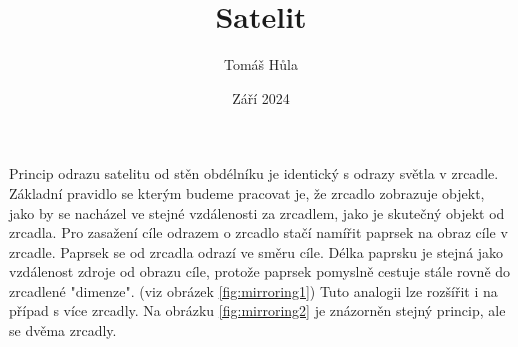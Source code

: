 \documentclass[11pt, a4paper]{article}
\title{Satelit}
\author{Tomáš Hůla}
\date{Září 2024}
\begin{document}
    \maketitle

    Princip odrazu satelitu od stěn obdélníku je identický s odrazy světla v zrcadle.
    Základní pravidlo se kterým budeme pracovat je, že zrcadlo zobrazuje objekt, jako by se nacházel ve stejné vzdálenosti za zrcadlem, jako je skutečný objekt od zrcadla.
    Pro zasažení cíle odrazem o zrcadlo stačí namířit paprsek na obraz cíle v zrcadle.
    Paprsek se od zrcadla odrazí ve směru cíle.
    Délka paprsku je stejná jako vzdálenost zdroje od obrazu cíle, protože paprsek pomyslně cestuje stále rovně do zrcadlené "dimenze". (viz obrázek \ref{fig:mirroring1})
    Tuto analogii lze rozšířit i na případ s více zrcadly.
    Na obrázku \ref{fig:mirroring2} je znázorněn stejný princip, ale se dvěma zrcadly.
\end{document}
